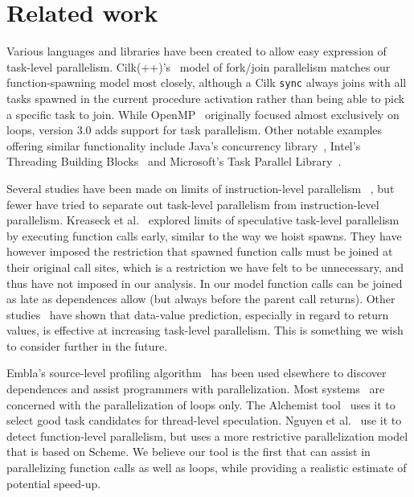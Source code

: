 \section{Related work}

Various languages and libraries have been created to allow easy
expression of task-level parallelism.  Cilk(++)'s~\cite{blumofe96cilk,leiserson09cilk}
model of fork/join parallelism matches our function-spawning model
most closely, although a Cilk {\tt sync} always joins with all tasks 
spawned in the current procedure activation rather than being able to 
pick a specific task to join. While OpenMP~\cite{dagum98openmp} 
originally focused almost exclusively on loops, version 3.0 adds 
support for task parallelism.  Other notable examples
offering similar functionality 
include Java's concurrency library~\cite{lea00java}, Intel's
Threading Building Blocks~\cite{reinders07intel} and Microsoft's
Task Parallel Library~\cite{leijen07parallel}.

Several studies have been made on limits of instruction-level parallelism~
\cite{wall91limits,postiff99limits},
but fewer have tried to separate out task-level
parallelism from instruction-level parallelism.  Kreaseck et al.\
 explored limits of speculative task-level
parallelism by executing function calls early, similar to the
way we hoist spawns.  They have however imposed the restriction that
spawned function calls must be joined at their original call sites,
which is a restriction we have felt to be unnecessary, and thus have
not imposed in our analysis.  In our model function calls can be
joined as late as dependences allow (but always before the parent
call returns).  Other studies~\cite{warg01limits,oplinger99insearch}
have shown that data-value prediction, especially in regard to return
values, is effective at increasing task-level parallelism.  This is
something we wish to consider further in the future.

Embla's source-level profiling algorithm~\cite{embla:08} has been used 
elsewhere to discover dependences and assist programmers with parallelization.
Most systems~\cite{wu08compiler,tournavitis09towards,larus93loop}
are concerned with the parallelization of loops only.
The Alchemist tool~\cite{zhang09alchemist} uses it
to select good task candidates for thread-level speculation.
Nguyen et al.~\cite{nguyen02parallelizing} use it to detect function-level parallelism,
but uses a more restrictive parallelization model that is based on Scheme.
We believe our tool is the first that can assist in parallelizing function calls as well as loops,
while providing a realistic estimate of potential speed-up.

